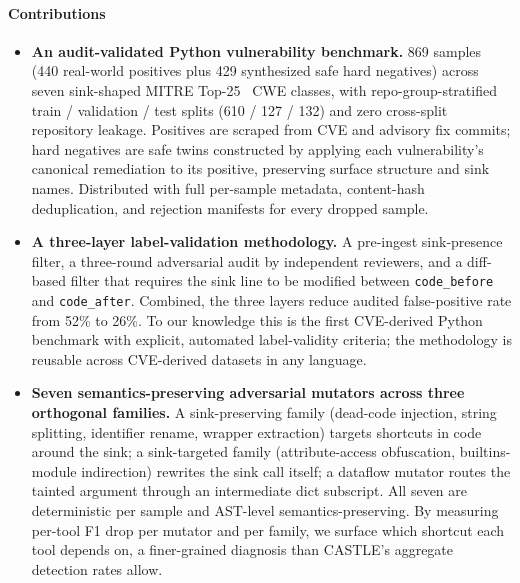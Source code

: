 \paragraph{Contributions}
\begin{itemize}
  \item \textbf{An audit-validated Python vulnerability benchmark.}
    869 samples (440 real-world positives plus 429 synthesized safe
    hard negatives) across seven sink-shaped MITRE
    Top-25~\cite{mitre_top25} CWE classes, with repo-group-stratified
    train / validation / test splits (610 / 127 / 132) and zero
    cross-split repository leakage. Positives are scraped from CVE and
    advisory fix commits; hard negatives are safe twins constructed by
    applying each vulnerability's canonical remediation to its positive,
    preserving surface structure and sink names. Distributed with full
    per-sample metadata, content-hash deduplication, and rejection
    manifests for every dropped sample.

  \item \textbf{A three-layer label-validation methodology.} A pre-ingest
    sink-presence filter, a three-round adversarial audit by independent
    reviewers, and a diff-based filter that requires the sink line to be
    modified between \texttt{code\_before} and \texttt{code\_after}.
    Combined, the three layers reduce audited false-positive rate from
    52\% to 26\%. To our knowledge this is the first CVE-derived Python
    benchmark with explicit, automated label-validity criteria; the
    methodology is reusable across CVE-derived datasets in any language.

  \item \textbf{Seven semantics-preserving adversarial mutators
    across three orthogonal families.} A sink-preserving family
    (dead-code injection, string splitting, identifier rename, wrapper
    extraction) targets shortcuts in code around the sink; a
    sink-targeted family (attribute-access obfuscation,
    builtins-module indirection) rewrites the sink call itself; a
    dataflow mutator routes the tainted argument through an
    intermediate dict subscript. All seven are deterministic per
    sample and AST-level semantics-preserving. By measuring per-tool
    F1 drop per mutator and per family, we surface which shortcut
    each tool depends on, a finer-grained diagnosis than CASTLE's
    aggregate detection rates allow.


\end{itemize}
